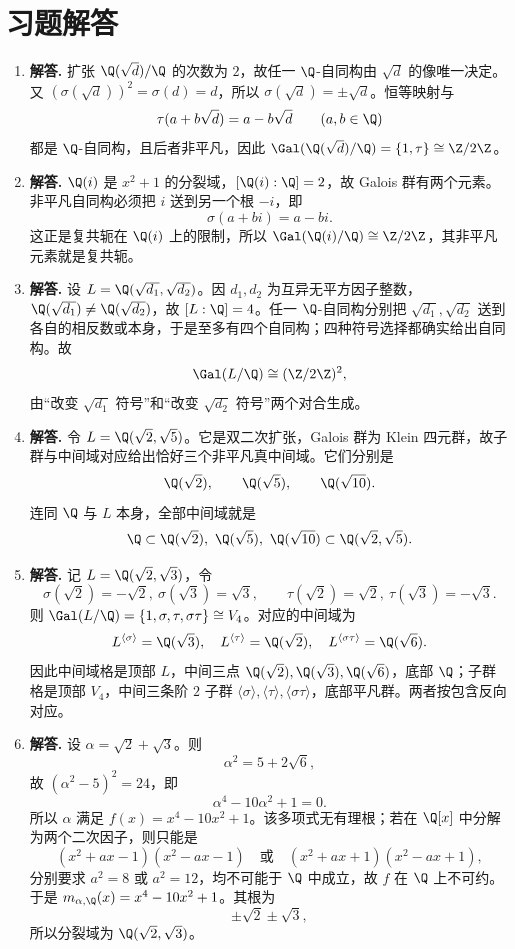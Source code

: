 \section*{习题解答}

\begin{enumerate}[label=\textbf{\arabic*.}, leftmargin=*, itemsep=1em]
\item \textbf{解答.} 扩张 $\Q(\sqrt d)/\Q$ 的次数为 $2$，故任一 $\Q$-自同构由 $\sqrt d$ 的像唯一决定。又 $(\sigma(\sqrt d))^2=\sigma(d)=d$，所以 $\sigma(\sqrt d)=\pm\sqrt d$。恒等映射与
\[
\tau(a+b\sqrt d)=a-b\sqrt d\qquad(a,b\in\Q)
\]
都是 $\Q$-自同构，且后者非平凡，因此 $\Gal(\Q(\sqrt d)/\Q)=\{1,\tau\}\cong \Z/2\Z$。

\item \textbf{解答.} $\Q(i)$ 是 $x^2+1$ 的分裂域，$[\Q(i):\Q]=2$，故 Galois 群有两个元素。非平凡自同构必须把 $i$ 送到另一个根 $-i$，即
\[
\sigma(a+bi)=a-bi.
\]
这正是复共轭在 $\Q(i)$ 上的限制，所以 $\Gal(\Q(i)/\Q)\cong \Z/2\Z$，其非平凡元素就是复共轭。

\item \textbf{解答.} 设 $L=\Q(\sqrt{d_1},\sqrt{d_2})$。因 $d_1,d_2$ 为互异无平方因子整数，$\Q(\sqrt{d_1})\neq \Q(\sqrt{d_2})$，故 $[L:\Q]=4$。任一 $\Q$-自同构分别把 $\sqrt{d_1},\sqrt{d_2}$ 送到各自的相反数或本身，于是至多有四个自同构；四种符号选择都确实给出自同构。故
\[
\Gal(L/\Q)\cong (\Z/2\Z)^2,
\]
由“改变 $\sqrt{d_1}$ 符号”和“改变 $\sqrt{d_2}$ 符号”两个对合生成。

\item \textbf{解答.} 令 $L=\Q(\sqrt2,\sqrt5)$。它是双二次扩张，Galois 群为 Klein 四元群，故子群与中间域对应给出恰好三个非平凡真中间域。它们分别是
\[
\Q(\sqrt2),\qquad \Q(\sqrt5),\qquad \Q(\sqrt{10}).
\]
连同 $\Q$ 与 $L$ 本身，全部中间域就是
\[
\Q\subset \Q(\sqrt2),\ \Q(\sqrt5),\ \Q(\sqrt{10})\subset \Q(\sqrt2,\sqrt5).
\]

\item \textbf{解答.} 记 $L=\Q(\sqrt2,\sqrt3)$，令
\[
\sigma(\sqrt2)=-\sqrt2,\ \sigma(\sqrt3)=\sqrt3,\qquad
\tau(\sqrt2)=\sqrt2,\ \tau(\sqrt3)=-\sqrt3.
\]
则 $\Gal(L/\Q)=\{1,\sigma,\tau,\sigma\tau\}\cong V_4$。对应的中间域为
\[
L^{\langle\sigma\rangle}=\Q(\sqrt3),\quad L^{\langle\tau\rangle}=\Q(\sqrt2),\quad L^{\langle\sigma\tau\rangle}=\Q(\sqrt6).
\]
因此中间域格是顶部 $L$，中间三点 $\Q(\sqrt2),\Q(\sqrt3),\Q(\sqrt6)$，底部 $\Q$；子群格是顶部 $V_4$，中间三条阶 $2$ 子群 $\langle\sigma\rangle,\langle\tau\rangle,\langle\sigma\tau\rangle$，底部平凡群。两者按包含反向对应。

\item \textbf{解答.} 设 $\alpha=\sqrt2+\sqrt3$。则
\[
\alpha^2=5+2\sqrt6,
\]
故 $(\alpha^2-5)^2=24$，即
\[
\alpha^4-10\alpha^2+1=0.
\]
所以 $\alpha$ 满足 $f(x)=x^4-10x^2+1$。该多项式无有理根；若在 $\Q[x]$ 中分解为两个二次因子，则只能是
\[(x^2+ax-1)(x^2-ax-1)\quad\text{或}\quad (x^2+ax+1)(x^2-ax+1),\]
分别要求 $a^2=8$ 或 $a^2=12$，均不可能于 $\Q$ 中成立，故 $f$ 在 $\Q$ 上不可约。于是 $m_{\alpha,\Q}(x)=x^4-10x^2+1$。其根为
\[
\pm\sqrt2\pm\sqrt3,
\]
所以分裂域为 $\Q(\sqrt2,\sqrt3)$。


\end{enumerate}

